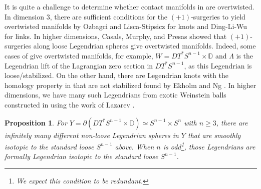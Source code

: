 \documentclass[reqno,11pt]{amsart}
\numberwithin{equation}{section}
\newtheorem{proposition}[theorem]{\textbf{Proposition}}
\def\D{{\mathbb D}}
\DeclareMathOperator{\CH}{CH}
\DeclareMathOperator{\CC}{CC}
\begin{document}

It is quite a challenge to determine whether contact manifolds in  are overtwisted. In dimension $3$, there are sufficient conditions for the $(+1)$-surgeries to yield overtwisted manifolds by Ozbagci \cite{zbMATH02147034} and Lisca-Stipsicz \cite{zbMATH05190395} for knots and Ding-Li-Wu \cite{DLW} for links. In higher dimensions, Casals, Murphy, and Presas \cite{zbMATH07010365} showed that $(+1)$-surgeries along loose Legendrian spheres give overtwisted manifolds. Indeed, some cases of  give overtwisted manifolds, for example, $W=DT^*{S^{n-1}}\times \D$ and $\Lambda$ is the Legendrian lift of the Lagrangian zero section in $DT^*S^{n-1}$, as this Legendrian is loose/stabilized. On the other hand, there are Legendrian knots with the homology property in  that are not stabilized found by Ekholm and Ng \cite[Corollary 2.22, Proposition 3.9]{zbMATH06471194}. In higher dimensions, we have many such Legendrians from exotic Weinstein balls constructed in \cite{abouzaid2010altering,zbMATH05553983,zbMATH02242665,zbMATH07367119} using the work of Lazarev \cite{zbMATH07305775}.
\begin{proposition}\label{prop:exotic}
    For $Y=\partial(DT^*S^{n-1}\times \D)\simeq S^{n-1}\times S^n$ with $n\ge 3$, there are infinitely many different non-loose Legendrian spheres in $Y$ that are smoothly isotopic to the standard loose $S^{n-1}$ above. When $n$ is odd\footnote{We expect this condition to be redundant.}, those Legendrians are formally Legendrian isotopic to the standard loose $S^{n-1}$.
\end{proposition}
\end{document}
